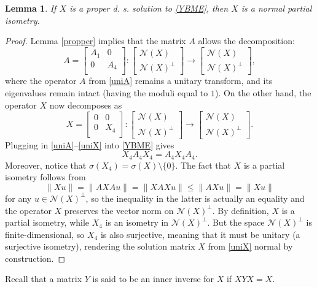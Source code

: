 \documentclass{article}
\newtheorem{lemma}{Lemma}[section]
\theoremstyle{definition}\newtheorem{example}{Example}[section]
\def\N{{\mathcal{N}}}
\newcommand{\mat}[4]{\left[\begin{array}{cc}#1 & #2 \\ #3 & #4 \\
	\end{array}\right]}
\begin{document}
	\begin{lemma}\label{partialisom} If $X$ is a proper d. s. solution to \eqref{YBME}, then  $X$ is a normal partial isometry.
	\end{lemma}
	\begin{proof}
		Lemma \ref{propper} implies that the matrix $A$ allows the decomposition:
		\begin{equation}
			\label{uniA}
			A=\mat{A_1}{0}{0}{A_4}:\left[\begin{array}{c}\N(X)\\\N(X)^\perp\end{array}\right]\to\left[\begin{array}{c}\N(X)\\\N(X)^\perp\end{array}\right],
		\end{equation}
		where the operator $A$ from \eqref{uniA} remains a unitary transform, and its eigenvalues remain intact (having the moduli equal to $1$). On the other hand, the operator $X$ now decomposes as
		\begin{equation}
			\label{uniX}
			X=\mat{0}{0}{0}{X_4}:\left[\begin{array}{c}\N(X)\\\N(X)^\perp\end{array}\right]\to\left[\begin{array}{c}\N(X)\\\N(X)^\perp\end{array}\right]. 
		\end{equation}
		Plugging in \eqref{uniA}--\eqref{uniX} into \eqref{YBME} gives
		\begin{equation}\label{unitaryX4}X_4A_4X_4=A_4X_4A_4.\end{equation}
		Moreover, notice that $\sigma(X_4)=\sigma(X)\setminus\{0\}$. The fact that $X$ is a partial isometry follows from
		$$\|Xu\|=\|AXAu\|=\|XAXu\|\leq \|AXu\|=\|Xu\|$$
		for any $u\in\N(X)^\perp$, so the inequality in the latter is actually an equality and the operator $X$ preserves the vector norm on $\N(X)^\perp$. By definition, $X$ is a partial isometry, while $X_4$ is an isometry in $\N(X)^\perp$. But the space $\N(X)^\perp$ is finite-dimensional, so $X_4$ is also surjective, meaning that it must be unitary (a surjective isometry), rendering the solution matrix $X$ from \eqref{uniX} normal by construction. 
	\end{proof} 
	
	Recall that a matrix $Y$ is said to be an inner inverse for $X$ if $XYX=X$. 
	
\end{document}
